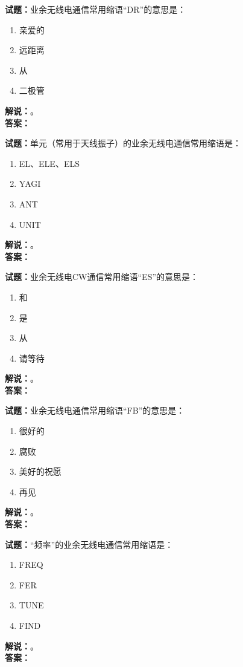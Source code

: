 \documentclass{ctexbook}
\begin{document}
\bigskip

\noindent\textbf{试题：}业余无线电通信常用缩语“DR”的意思是：
\begin{enumerate}[leftmargin=3em]
  \item 亲爱的
  \item 远距离
  \item 从
  \item 二极管
\end{enumerate}
\noindent\textbf{解说：}\textbf{}。\\\noindent\textbf{答案：}

\bigskip

\noindent\textbf{试题：}单元（常用于天线振子）的业余无线电通信常用缩语是：
\begin{enumerate}[leftmargin=3em]
  \item EL、ELE、ELS
  \item YAGI
  \item ANT
  \item UNIT
\end{enumerate}
\noindent\textbf{解说：}\textbf{}。\\\noindent\textbf{答案：}

\bigskip

\noindent\textbf{试题：}业余无线电CW通信常用缩语“ES”的意思是：
\begin{enumerate}[leftmargin=3em]
  \item 和
  \item 是
  \item 从
  \item 请等待
\end{enumerate}
\noindent\textbf{解说：}\textbf{}。\\\noindent\textbf{答案：}

\bigskip

\noindent\textbf{试题：}业余无线电通信常用缩语“FB”的意思是：
\begin{enumerate}[leftmargin=3em]
  \item 很好的
  \item 腐败
  \item 美好的祝愿
  \item 再见
\end{enumerate}
\noindent\textbf{解说：}\textbf{}。\\\noindent\textbf{答案：}

\bigskip

\noindent\textbf{试题：}“频率”的业余无线电通信常用缩语是：
\begin{enumerate}[leftmargin=3em]
  \item FREQ
  \item FER
  \item TUNE
  \item FIND
\end{enumerate}
\noindent\textbf{解说：}\textbf{}。\\\noindent\textbf{答案：}
\end{document}

